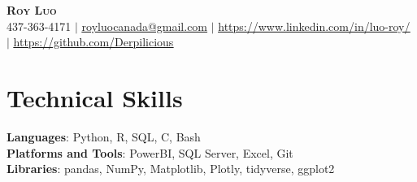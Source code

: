 \documentclass[letterpaper,11pt]{article}
\makeatletter
\newcommand{\resumeSubheading}[4]{
  \vspace{-2pt}\item
    \begin{tabular*}{0.97\textwidth}[t]{l@{\extracolsep{\fill}}r}
      \textbf{#1} & #2 \\
      \textit{\small#3} & \textit{\small #4} \\
    \end{tabular*}\vspace{-7pt}
}
\newcommand{\resumeSubHeadingListStart}{\begin{itemize}[leftmargin=0.15in, label={}]}
\makeatother
\begin{document}

\begin{center}
    \textbf{\Huge \scshape Roy Luo} \\ \vspace{1pt}
    \small 437-363-4171 $|$ \href{mailto:royluocanada@gmail.com}{\underline{royluocanada@gmail.com}} $|$ 
    \href{https://linkedin.com/in/luo-roy/}{\underline{https://www.linkedin.com/in/luo-roy/}} $|$
    \href{https://github.com/Derpilicious}{\underline{https://github.com/Derpilicious}}
\end{center}
 

      
\section{Technical Skills}
 \begin{itemize}[leftmargin=0.15in, label={}]
    \small{\item{
     \textbf{Languages}{: Python, R, SQL, C, Bash} \\
     \textbf{Platforms and Tools}{: PowerBI, SQL Server, Excel, Git} \\
     \textbf{Libraries}{: pandas, NumPy, Matplotlib, Plotly, tidyverse, ggplot2} \\
    }}
 \end{itemize}
\end{document}
